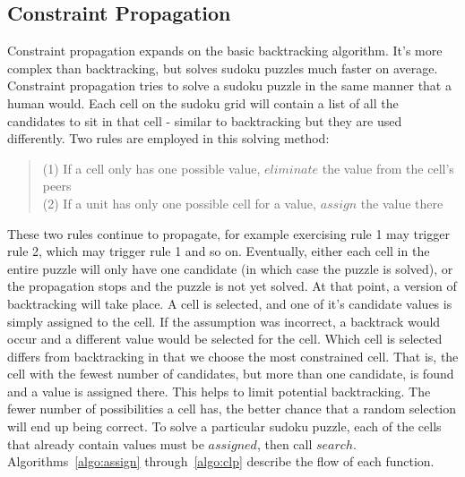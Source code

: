     \subsection{Constraint Propagation}
    Constraint propagation expands on the basic backtracking algorithm. It's more complex than backtracking, but solves sudoku puzzles
    much faster on average. Constraint propagation tries to solve a sudoku puzzle in the same manner that a human would. Each cell on
    the sudoku grid will contain a list of all the candidates to sit in that cell - similar to backtracking but they are used differently.
    Two rules are employed in this solving method:
    \begin{verse}
        (1) If a cell only has one possible value, $eliminate$ the value from the cell's peers \\
        (2) If a unit has only one possible cell for a value, $assign$ the value there
    \end{verse}
    These two rules continue to propagate, for example exercising rule 1 may trigger rule 2, which may trigger rule 1 and so on. Eventually,
    either each cell in the entire puzzle will only have one candidate (in which case the puzzle is solved), or the propagation stops and the
    puzzle is not yet solved. At that point, a version of backtracking will take place. A cell is selected, and one of it's candidate values
    is simply assigned to the cell. If the assumption was incorrect, a backtrack would occur and a different value would be selected for the cell.
    Which cell is selected differs from backtracking in that we choose the most constrained cell. That is, the cell with the fewest number of
    candidates, but more than one candidate, is found and a value is assigned there. This helps to limit potential backtracking. The fewer number
    of possibilities a cell has, the better chance that a random selection will end up being correct. 
    To solve a particular sudoku puzzle, each of the cells that already contain values must be $assigned$, then call $search$.
    Algorithms~\ref{algo:assign} through~\ref{algo:clp} describe the flow of each function.
